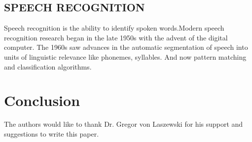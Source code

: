\documentclass[sigconf]{acmart}
\begin{document}
\subsection{SPEECH RECOGNITION}
Speech recognition is the ability to identify spoken words.Modern speech recognition research began in the late 1950s with the advent of the digital computer. The 1960s saw advances in the automatic segmentation of speech into units of linguistic relevance like phonemes, syllables. And now pattern matching and classification algorithms.


\section{Conclusion}



\begin{acks}

  The authors would like to thank Dr. Gregor von Laszewski for his support and suggestions to write this paper.

\end{acks}


 

\appendix
\end{document}
